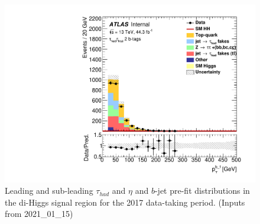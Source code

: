 \begin{figure}
\includegraphics[width=.45\textwidth]{figures/selection/HadHad_HH/Plots2017/Region_BMin0_incJet1_distJet1Pt_J2_Y2015_DLLOS_T2_SpcTauHH_L0_Prefit.pdf}
\caption{Leading and sub-leading $\tau_{had}$ \pt and $\eta$ and $b$-jet \pt pre-fit
  distributions in the di-Higgs \hadhad signal region for the 2017 data-taking period. (Inputs from 2021\_01\_15)}
\label{fig:HadHadPreselectionPtDistributions2017}
\end{figure}

